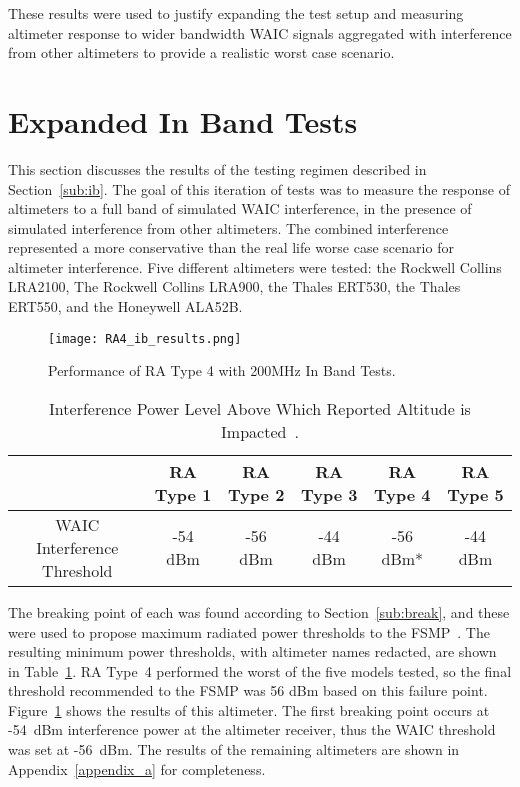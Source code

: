 These results were used to justify expanding the test setup and measuring altimeter response to wider bandwidth WAIC signals aggregated with interference from other altimeters to provide a realistic worst case scenario.

\section{Expanded In Band Tests}\label{sec:dvsg_ib_results}
This section discusses the results of the testing regimen described in Section~\ref{sub:ib}. The goal of this iteration of tests was to measure the response of altimeters to a full band of simulated WAIC interference, in the presence of simulated interference from other altimeters. The combined interference represented a more conservative than the real life worse case scenario for altimeter interference. Five different altimeters were tested: the Rockwell Collins LRA2100, The Rockwell Collins LRA900, the Thales ERT530, the Thales ERT550, and the Honeywell ALA52B.
 \begin{figure}[h!]
	\centering
	\texttt{[image: RA4\_ib\_results.png]}
	\caption{Performance of RA Type 4 with 200MHz In Band Tests.}
	\label{fig:RA4}
\end{figure}

\begin{table}[]
\begin{tabular}{@{}cccccc@{}}
\toprule
                            & RA Type 1 & RA Type 2 & RA Type 3 & RA Type 4 & RA Type 5 \\ \midrule
WAIC Interference Threshold & -54 dBm   & -56 dBm   & -44 dBm   & -56 dBm*  & -44 dBm   \\ \bottomrule
\end{tabular}
\caption{Interference Power Level Above Which Reported Altitude is Impacted~\cite{uwe_radio_2019}.}
\label{tab:ib_thresholds_fsmp}
\end{table}

The breaking point of each was found according to Section~\ref{sub:break}, and these were used to propose maximum radiated power thresholds to the FSMP~\cite{uwe_radio_2019}. The resulting minimum power thresholds, with altimeter names redacted, are shown in Table~\ref{tab:ib_thresholds_fsmp}. RA Type~4 performed the worst of the five models tested, so the final threshold recommended to the FSMP was 56 dBm based on this failure point. Figure~\ref{fig:RA4} 
 shows the results of this altimeter. The first breaking point occurs at -54~dBm interference power at the altimeter receiver, thus the WAIC threshold was set at -56~dBm. The results of the remaining altimeters are shown in Appendix~\ref{appendix_a} for completeness. 

